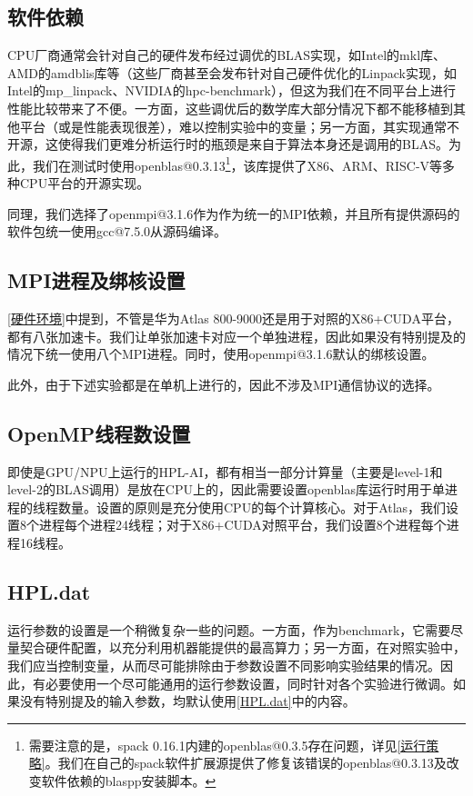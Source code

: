 \subsection{软件依赖}
\label{软件依赖}

CPU厂商通常会针对自己的硬件发布经过调优的BLAS实现，如Intel的mkl库、AMD的amdblis库等（这些厂商甚至会发布针对自己硬件优化的Linpack实现，如Intel的mp\_linpack、NVIDIA的hpc-benchmark），但这为我们在不同平台上进行性能比较带来了不便。一方面，这些调优后的数学库大部分情况下都不能移植到其他平台（或是性能表现很差），难以控制实验中的变量；另一方面，其实现通常不开源，这使得我们更难分析运行时的瓶颈是来自于算法本身还是调用的BLAS。为此，我们在测试时使用openblas@0.3.13\footnote{需要注意的是，spack 0.16.1内建的openblas@0.3.5存在问题，详见\autoref{运行策略}。我们在自己的spack软件扩展源提供了修复该错误的openblas@0.3.13及改变软件依赖的blaspp安装脚本。}，该库提供了X86、ARM、RISC-V等多种CPU平台的开源实现。

同理，我们选择了openmpi@3.1.6作为作为统一的MPI依赖，并且所有提供源码的软件包统一使用gcc@7.5.0从源码编译。

\subsection{MPI进程及绑核设置}

\autoref{硬件环境}中提到，不管是华为Atlas 800-9000还是用于对照的X86+CUDA平台，都有八张加速卡。我们让单张加速卡对应一个单独进程，因此如果没有特别提及的情况下统一使用八个MPI进程。同时，使用openmpi@3.1.6默认的绑核设置。

此外，由于下述实验都是在单机上进行的，因此不涉及MPI通信协议的选择。

\subsection{OpenMP线程数设置}

即使是GPU/NPU上运行的HPL-AI，都有相当一部分计算量（主要是level-1和level-2的BLAS调用）是放在CPU上的，因此需要设置openblas库运行时用于单进程的线程数量。设置的原则是充分使用CPU的每个计算核心。对于Atlas，我们设置8个进程每个进程24线程；对于X86+CUDA对照平台，我们设置8个进程每个进程16线程。

\subsection{HPL.dat}

运行参数的设置是一个稍微复杂一些的问题。一方面，作为benchmark，它需要尽量契合硬件配置，以充分利用机器能提供的最高算力；另一方面，在对照实验中，我们应当控制变量，从而尽可能排除由于参数设置不同影响实验结果的情况。因此，有必要使用一个尽可能通用的运行参数设置，同时针对各个实验进行微调。如果没有特别提及的输入参数，均默认使用\autoref{HPL.dat}中的内容。

